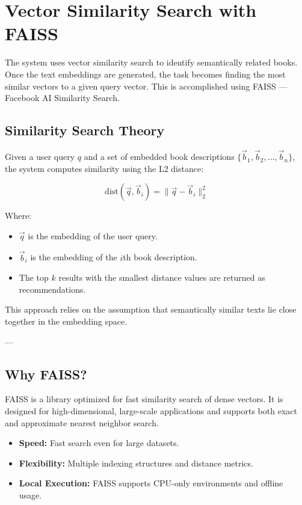 \chapter{Vector Similarity Search with FAISS}
\label{chapter:similarity}

The system uses vector similarity search to identify semantically related books. 
Once the text embeddings are generated, the task becomes finding the most similar vectors to a given query vector. 
This is accomplished using FAISS — Facebook AI Similarity Search\cite{faiss}.

\section{Similarity Search Theory}
\label{sec:similarity-theory}

Given a user query $q$ and a set of embedded book descriptions $\{\vec{b}_1, \vec{b}_2, \dots, \vec{b}_n\}$, the system computes similarity using the L2 distance:

\[
\text{dist}(\vec{q}, \vec{b}_i) = \|\vec{q} - \vec{b}_i\|_2^2
\]

Where:
\begin{itemize}
    \item $\vec{q}$ is the embedding of the user query.
    \item $\vec{b}_i$ is the embedding of the $i$th book description.
    \item The top $k$ results with the smallest distance values are returned as recommendations.
\end{itemize}

This approach relies on the assumption that semantically similar texts lie close together in the embedding space.

---

\section{Why FAISS?}
\label{sec:faiss-choice}

FAISS is a library optimized for fast similarity search of dense vectors. It is designed for high-dimensional, large-scale applications and supports both exact and approximate nearest neighbor search.

\begin{itemize}
    \item \textbf{Speed:} Fast search even for large datasets.
    \item \textbf{Flexibility:} Multiple indexing structures and distance metrics.
    \item \textbf{Local Execution:} FAISS supports CPU-only environments and offline usage.
\end{itemize}

